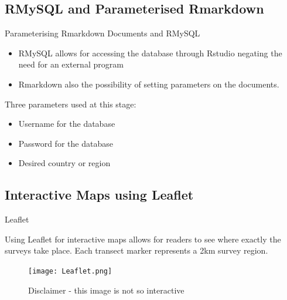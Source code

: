 \documentclass{beamer}
\begin{document}
          \subsection{RMySQL and Parameterised Rmarkdown}
              \begin{frame}{Parameterising Rmarkdown Documents and RMySQL}
                  \begin{itemize}
                    \item RMySQL allows for accessing the database through Rstudio negating the need for an external program
                    \item Rmarkdown also the possibility of setting parameters on the documents.
                  \end{itemize}

                  \medskip

                  Three parameters used at this stage:
                  \begin{itemize}
                    \item Username for the database
                    \item Password for the database
                    \item Desired country or region
                  \end{itemize}
                \end{frame}
                
                \subsection{Interactive Maps using Leaflet}
                    \begin{frame}{Leaflet}

                       Using Leaflet\footnotemark {} for interactive maps allows for readers to see where exactly the surveys take place. Each transect marker represents a 2km survey region.

                        \begin{figure}
                           \centering
                           \texttt{[image: Leaflet.png]}
                           \caption{Disclaimer - this image is not so interactive }
                        \end{figure}
                    \end{frame}
\end{document}
